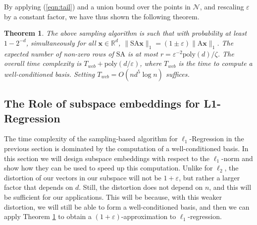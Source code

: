 \documentclass[11pt]{article}
\newtheorem{theorem}{Theorem}
\newcommand{\mat}[1]{{\ensuremath{\bm{\mathrm{#1}}}}}
\def\matA{\mat{A}}
\def\matS{\mat{S}}
\def\x{{\mathbf x}}
\newcommand{\eps}{\varepsilon}
\newcommand{\poly}{{\mathrm{poly}}}
\begin{document}
By applying (\ref{eqn:tail}) and a union bound over the points in $\mathcal{N}$, and rescaling $\eps$ by a constant factor, we have thus
shown the following theorem.
\begin{theorem}\label{thm:slow}
The above sampling algorithm is such that with probability at least $1-2^{-d}$, simultaneously for all $\x \in \mathbb{R}^d$,
$\|\matS \matA \x\|_1 = (1\pm \eps)\|\matA \x\|_1$. The expected number of non-zero rows of $\matS \matA$ is at most $r = \eps^{-2} \poly(d) / \zeta$. The 
overall time complexity is $T_{wcb} + \poly(d/\eps)$, where $T_{wcb}$ is the time to compute a well-conditioned basis. Setting
$T_{wcb} = O(nd^5 \log n)$ suffices. 
\end{theorem}

\subsection{The Role of subspace embeddings for L1-Regression}\label{sec:l1Subspace}
The time complexity of the sampling-based algorithm for $\ell_1$-Regression in the previous section is dominated by the computation of 
a well-conditioned basis. In this section we will design subspace embeddings with respect to the $\ell_1$-norm and show how they 
can be used to speed up this computation. Unlike for $\ell_2$, the distortion of our vectors in our subspace will not be $1+\eps$, but
rather a larger factor that depends on $d$. Still, the distortion does not depend on $n$, and this will be sufficient for our applications. This
will be because, with this weaker distortion, we will still be able to form a well-conditioned basis, and then we can apply 
Theorem \ref{thm:slow} to obtain a $(1+\eps)$-approximation to $\ell_1$-regression. 
\end{document}

